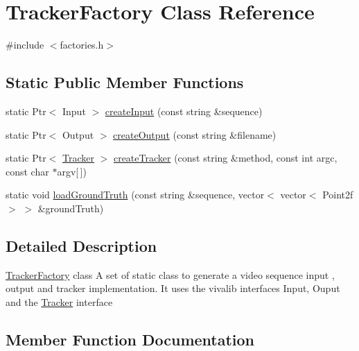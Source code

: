 \hypertarget{class_tracker_factory}{}\section{Tracker\+Factory Class Reference}
\label{class_tracker_factory}


{\ttfamily \#include $<$factories.\+h$>$}

\subsection*{Static Public Member Functions}
\begin{DoxyCompactItemize}
\item 
static Ptr$<$ Input $>$ \hyperlink{class_tracker_factory_aa041aac3b90d0f3e0ba83619eef2c996}{create\+Input} (const string \&sequence)
\item 
static Ptr$<$ Output $>$ \hyperlink{class_tracker_factory_a0200b3f400d64226078288c9c5af5ac9}{create\+Output} (const string \&filename)
\item 
static Ptr$<$ \hyperlink{class_tracker}{Tracker} $>$ \hyperlink{class_tracker_factory_ac4564fb6b54d28e9237404eeadee4127}{create\+Tracker} (const string \&method, const int argc, const char $\ast$argv\mbox{[}$\,$\mbox{]})
\item 
static void \hyperlink{class_tracker_factory_a27d44002a9992d4c474cf2da12e93c8e}{load\+Ground\+Truth} (const string \&sequence, vector$<$ vector$<$ Point2f $>$ $>$ \&ground\+Truth)
\end{DoxyCompactItemize}


\subsection{Detailed Description}
\hyperlink{class_tracker_factory}{Tracker\+Factory} class A set of static class to generate a video sequence input , output and tracker implementation. It uses the vivalib interfaces Input, Ouput and the \hyperlink{class_tracker}{Tracker} interface 

\subsection{Member Function Documentation}
